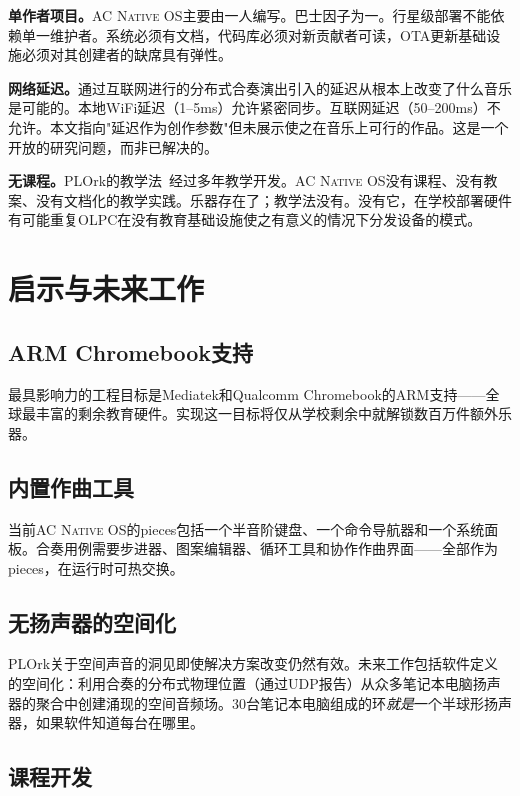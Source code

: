 \documentclass[10pt,letterpaper,twocolumn]{article}
\newcommand{\acos}{\textsc{AC Native OS}}
\begin{document}
\textbf{单作者项目。}\acos{}主要由一人编写。巴士因子为一。行星级部署不能依赖单一维护者。系统必须有文档，代码库必须对新贡献者可读，OTA更新基础设施必须对其创建者的缺席具有弹性。

\textbf{网络延迟。}通过互联网进行的分布式合奏演出引入的延迟从根本上改变了什么音乐是可能的。本地WiFi延迟（1--5ms）允许紧密同步。互联网延迟（50--200ms）不允许。本文指向"延迟作为创作参数"但未展示使之在音乐上可行的作品。这是一个开放的研究问题，而非已解决的。

\textbf{无课程。}PLOrk的教学法~\citep{trueman2007why}经过多年教学开发。\acos{}没有课程、没有教案、没有文档化的教学实践。乐器存在了；教学法没有。没有它，在学校部署硬件有可能重复OLPC在没有教育基础设施使之有意义的情况下分发设备的模式。


\section{启示与未来工作}
\label{sec:future}

\subsection{ARM Chromebook支持}

最具影响力的工程目标是Mediatek和Qualcomm Chromebook的ARM支持——全球最丰富的剩余教育硬件。实现这一目标将仅从学校剩余中就解锁数百万件额外乐器。

\subsection{内置作曲工具}

当前\acos{}的pieces包括一个半音阶键盘、一个命令导航器和一个系统面板。合奏用例需要步进器、图案编辑器、循环工具和协作作曲界面——全部作为pieces，在运行时可热交换。

\subsection{无扬声器的空间化}

PLOrk关于空间声音的洞见即使解决方案改变仍然有效。未来工作包括软件定义的空间化：利用合奏的分布式物理位置（通过UDP报告）从众多笔记本电脑扬声器的聚合中创建涌现的空间音频场。30台笔记本电脑组成的环\emph{就是}一个半球形扬声器，如果软件知道每台在哪里。

\subsection{课程开发}
\end{document}
